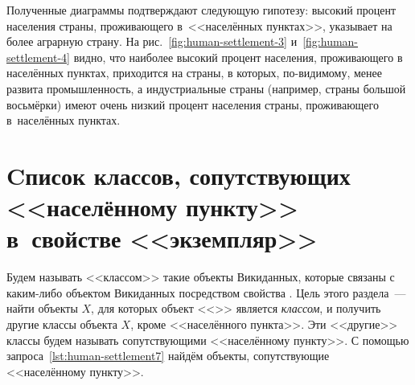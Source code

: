 
Полученные диаграммы подтверждают следующую гипотезу: 
высокий процент населения страны, проживающего в~<<населённых пунктах>>, 
указывает на более аграрную страну. 
На рис.~\ref{fig:human-settlement-3} и~\ref{fig:human-settlement-4} видно, 
что наиболее высокий процент населения, проживающего в населённых пунктах, 
приходится на страны, в которых, по-видимому, менее развита промышленность, 
а индустриальные страны (например, страны большой восьмёрки) имеют очень низкий процент населения страны, 
проживающего в~населённых пунктах.




\section[Cписок классов, сопутствующих <<населённому пункту>> в~свойстве <<экземпляр>>]{Cписок классов, сопутствующих <<населённому пункту>>\\в~свойстве <<экземпляр>>}
\label{human-settlement:tag1}

Будем называть <<классом>> такие объекты Викиданных, 
которые связаны с каким-либо объектом Викиданных посредством свойства . 
Цель этого раздела~--- найти объекты $X$, 
для которых объект <<>> является \emph{классом}, 
и получить другие классы объекта $X$, кроме <<населённого пункта>>. 
Эти <<другие>> классы будем называть сопутствующими <<населённому пункту>>. 
С помощью запроса~\ref{lst:human-settlement7} 
найдём объекты, сопутствующие <<населённому пункту>>. 



